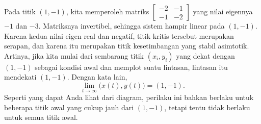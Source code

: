 \begin{example}
Pada titik $(1,-1)$, kita memperoleh matriks
$\left[ \begin{smallmatrix} -2 & -1 \\ -1 & -2 \end{smallmatrix} \right]$
yang
nilai eigennya $-1$ dan $-3$.
Matriksnya invertibel, sehingga sistem hampir linear pada $(1,-1)$.
Karena kedua nilai eigen real dan negatif, titik
kritis tersebut merupakan serapan, dan karena itu merupakan titik kesetimbangan yang stabil asimtotik.
Artinya, jika kita mulai dari sembarang titik $(x_i,y_i)$ yang dekat dengan $(1,-1)$ sebagai
kondisi awal dan memplot suatu lintasan, lintasan itu mendekati $(1,-1)$.
Dengan kata lain,
\begin{equation*}
\lim_{t \to \infty} \bigl( x(t), y(t) \bigr) = (1,-1) .
\end{equation*}
Seperti yang dapat
Anda lihat dari diagram, perilaku ini bahkan berlaku untuk beberapa
titik awal yang cukup jauh dari $(1,-1)$, tetapi tentu tidak berlaku untuk semua
titik awal.
\end{example}

